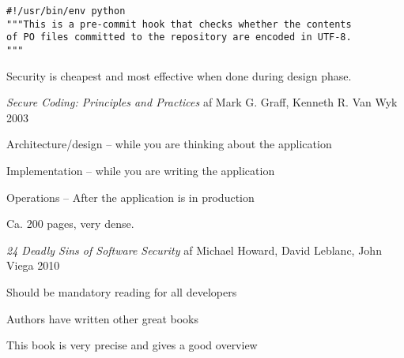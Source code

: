 \documentclass[Screen16to9,17pt]{foils}
\begin{document}
{\small {}}




\begin{verbatim}
#!/usr/bin/env python
"""This is a pre-commit hook that checks whether the contents
of PO files committed to the repository are encoded in UTF-8.
"""
\end{verbatim}

{\small {}}


\centerline{Security is cheapest and most effective when done during design phase.}




\vskip 2cm
{\emph{Secure Coding: Principles and Practices} af Mark G. Graff, Kenneth R. Van Wyk 2003}



\begin{list1}
\item Architecture/design -- while you are thinking about the application
\item Implementation -- while you are writing the application
\item Operations -- After the application is in production
\item Ca. 200 pages, very dense.
\end{list1}



{\emph{24 Deadly Sins of Software Security} af Michael Howard, David Leblanc, John Viega 2010}

\begin{list1}
\item Should be mandatory reading for all developers
\item Authors have written other great books
\item This book is very precise and gives a good overview
\end{list1}

\end{document}
